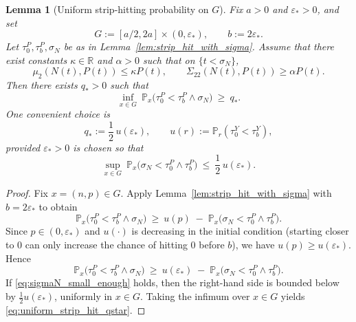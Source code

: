 \documentclass[pdflatex,sn-mathphys-ay]{sn-jnl}
\theoremstyle{thmstyleone}
\newtheorem{lemma}[theorem]{Lemma}
\theoremstyle{definition}
\theoremstyle{remark}
\begin{document}
\begin{appendices}
\begin{lemma}[Uniform strip-hitting probability on $G$]\label{lem:uniform_strip_hit_on_G}
Fix $a>0$ and $\varepsilon_*>0$, and set
\[
G:=[a/2,2a]\times(0,\varepsilon_*),\qquad b:=2\varepsilon_*.
\]
Let $\tau_0^P,\tau_b^P,\sigma_N$ be as in Lemma~\ref{lem:strip_hit_with_sigma}. Assume that there exist constants
$\kappa\in\mathbb R$ and $\alpha>0$ such that on $\{t<\sigma_N\}$,
\[
\mu_2(N(t),P(t))\le \kappa P(t),\qquad \Sigma_{22}(N(t),P(t))\ge \alpha P(t).
\]
Then there exists $q_*>0$ such that
\begin{equation}\label{eq:uniform_strip_hit_qstar}
\inf_{x\in G}\ \mathbb P_x\bigl(\tau_0^P<\tau_b^P\wedge\sigma_N\bigr)\ \ge\ q_*.
\end{equation}
One convenient choice is
\[
q_*:=\frac12\,u(\varepsilon_*),
\qquad
u(r):=\mathbb P_r(\tau_0^Y<\tau_b^Y),
\]
provided $\varepsilon_*>0$ is chosen so that
\begin{equation}\label{eq:sigmaN_small_enough}
\sup_{x\in G}\ \mathbb P_x\bigl(\sigma_N<\tau_0^P\wedge\tau_b^P\bigr)
\ \le\ \frac12\,u(\varepsilon_*).
\end{equation}
\end{lemma}

\begin{proof}
Fix $x=(n,p)\in G$. Apply Lemma~\ref{lem:strip_hit_with_sigma} with $b=2\varepsilon_*$ to obtain
\[
\mathbb P_x\bigl(\tau_0^P<\tau_b^P\wedge\sigma_N\bigr)
\ \ge\
u(p)\;-\;\mathbb P_x\bigl(\sigma_N<\tau_0^P\wedge\tau_b^P\bigr).
\]
Since $p\in(0,\varepsilon_*)$ and $u(\cdot)$ is decreasing in the initial condition (starting closer to $0$ can only
increase the chance of hitting $0$ before $b$), we have $u(p)\ge u(\varepsilon_*)$. Hence
\[
\mathbb P_x\bigl(\tau_0^P<\tau_b^P\wedge\sigma_N\bigr)
\ \ge\
u(\varepsilon_*)\;-\;\mathbb P_x\bigl(\sigma_N<\tau_0^P\wedge\tau_b^P\bigr).
\]
If \eqref{eq:sigmaN_small_enough} holds, then the right-hand side is bounded below by $\frac12u(\varepsilon_*)$,
uniformly in $x\in G$. Taking the infimum over $x\in G$ yields \eqref{eq:uniform_strip_hit_qstar}.
\end{proof}


\end{appendices}
\end{document}
